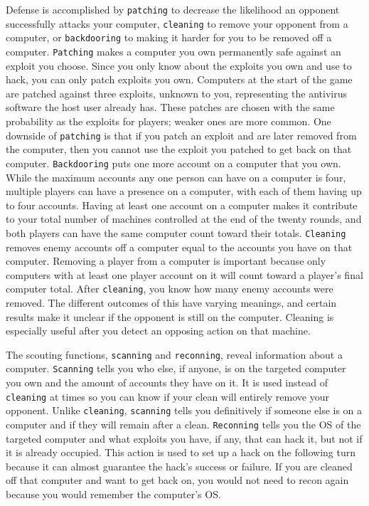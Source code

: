 Defense is accomplished by {\tt patching} to decrease the likelihood an opponent successfully attacks your computer, {\tt cleaning} to remove your opponent from a computer, or {\tt backdooring} to making it harder for you to be removed off a computer.  {\tt Patching} makes a computer you own permanently safe against an exploit you choose. Since you only know about the exploits you own and use to hack, you can only patch exploits you own. Computers at the start of the game are patched against three exploits, unknown to you, representing the antivirus software the host user already has. These patches are chosen with the same probability as the exploits for players; weaker ones are more common. One downside of {\tt patching} is that if you patch an exploit and are later removed from the computer, then you cannot use the exploit you patched to get back on that computer. {\tt Backdooring} puts one more account on a computer that you own. While the maximum accounts any one person can have on a computer is four, multiple players can have a presence on a computer, with each of them having up to four accounts. Having at least one account on a computer makes it contribute to your total number of machines controlled at the end of the twenty rounds, and both players can have the same computer count toward their totals.  {\tt Cleaning} removes enemy accounts off a computer equal to the accounts you have on that computer.  Removing a player from a computer is important because only computers with at least one player account on it will count toward a player's final computer total. After {\tt cleaning}, you know how many enemy accounts were removed.  The different outcomes of this have varying meanings, and certain results make it unclear if the opponent is still on the computer. Cleaning is especially useful after you detect an opposing action on that machine.

The scouting functions, {\tt scanning} and {\tt reconning}, reveal information about a computer. {\tt Scanning} tells you who else, if anyone, is on the targeted computer you own and the amount of accounts they have on it.  It is used instead of {\tt cleaning} at times so you can know if your clean will entirely remove your opponent. Unlike {\tt cleaning}, {\tt scanning} tells you definitively if someone else is on a computer and if they will remain after a clean.  {\tt Reconning} tells you the OS of the targeted computer and what exploits you have, if any, that can hack it, but not if it is already occupied. This action is used to set up a hack on the following turn because it can almost guarantee the hack's success or failure.  If you are cleaned off that computer and want to get back on, you would not need to recon again because you would remember the computer's OS.

